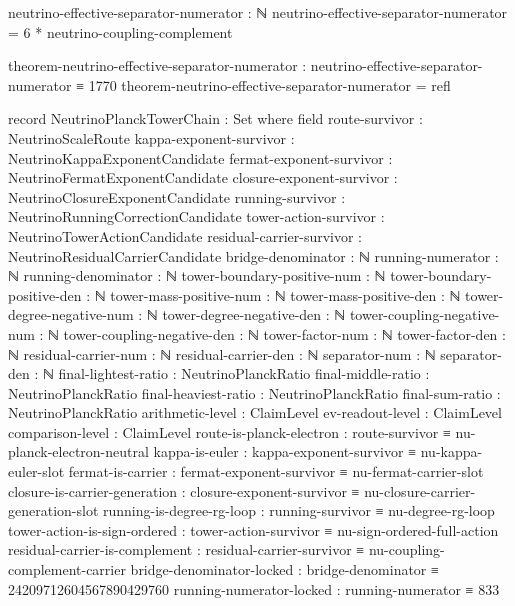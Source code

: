 \documentclass[11pt,a4paper]{book}
\begin{document}
\begin{code}
neutrino-effective-separator-numerator : ℕ
neutrino-effective-separator-numerator = 6 * neutrino-coupling-complement

theorem-neutrino-effective-separator-numerator :
  neutrino-effective-separator-numerator ≡ 1770
theorem-neutrino-effective-separator-numerator = refl

record NeutrinoPlanckTowerChain : Set where
  field
    route-survivor               : NeutrinoScaleRoute
    kappa-exponent-survivor      : NeutrinoKappaExponentCandidate
    fermat-exponent-survivor     : NeutrinoFermatExponentCandidate
    closure-exponent-survivor    : NeutrinoClosureExponentCandidate
    running-survivor             : NeutrinoRunningCorrectionCandidate
    tower-action-survivor        : NeutrinoTowerActionCandidate
    residual-carrier-survivor    : NeutrinoResidualCarrierCandidate
    bridge-denominator           : ℕ
    running-numerator            : ℕ
    running-denominator          : ℕ
    tower-boundary-positive-num  : ℕ
    tower-boundary-positive-den  : ℕ
    tower-mass-positive-num      : ℕ
    tower-mass-positive-den      : ℕ
    tower-degree-negative-num    : ℕ
    tower-degree-negative-den    : ℕ
    tower-coupling-negative-num  : ℕ
    tower-coupling-negative-den  : ℕ
    tower-factor-num             : ℕ
    tower-factor-den             : ℕ
    residual-carrier-num         : ℕ
    residual-carrier-den         : ℕ
    separator-num                : ℕ
    separator-den                : ℕ
    final-lightest-ratio         : NeutrinoPlanckRatio
    final-middle-ratio           : NeutrinoPlanckRatio
    final-heaviest-ratio         : NeutrinoPlanckRatio
    final-sum-ratio              : NeutrinoPlanckRatio
    arithmetic-level             : ClaimLevel
    ev-readout-level             : ClaimLevel
    comparison-level             : ClaimLevel
    route-is-planck-electron     :
      route-survivor ≡ nu-planck-electron-neutral
    kappa-is-euler               : kappa-exponent-survivor ≡ nu-kappa-euler-slot
    fermat-is-carrier            :
      fermat-exponent-survivor ≡ nu-fermat-carrier-slot
    closure-is-carrier-generation :
      closure-exponent-survivor ≡ nu-closure-carrier-generation-slot
    running-is-degree-rg-loop    : running-survivor ≡ nu-degree-rg-loop
    tower-action-is-sign-ordered :
      tower-action-survivor ≡ nu-sign-ordered-full-action
    residual-carrier-is-complement :
      residual-carrier-survivor ≡ nu-coupling-complement-carrier
    bridge-denominator-locked    :
      bridge-denominator ≡ 24209712604567890429760
    running-numerator-locked     : running-numerator ≡ 833

\end{code}
\end{document}
